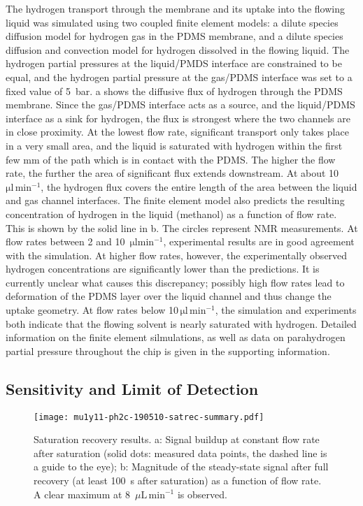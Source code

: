 The hydrogen transport through the membrane and its uptake into the flowing
liquid was simulated using two coupled finite element models: a dilute species
diffusion model for hydrogen gas in the PDMS membrane, and a dilute species
diffusion and convection model for hydrogen dissolved in the flowing liquid. The
hydrogen partial pressures at the liquid/PMDS interface are constrained to be
equal, and the hydrogen partial pressure at the gas/PDMS interface was set to a
fixed value of 5~bar. a shows the diffusive flux of hydrogen
through the PDMS membrane.  Since the gas/PDMS interface acts as a source, and
the liquid/PDMS interface as a sink for hydrogen, the flux is strongest where
the two channels are in close proximity. At the lowest flow rate, significant
transport only takes place in a very small area, and the liquid is saturated
with hydrogen within the first few mm of the path which is in contact with the
PDMS. The higher the flow rate, the further the area of significant flux extends
downstream. At about 10~$\mathrm{\mu l \,min^{-1}}$, the hydrogen flux covers
the entire length of the area between the liquid and gas channel interfaces. The
finite element model also predicts the resulting concentration of hydrogen in
the liquid (methanol) as a function of flow rate. This is shown by the solid
line in  b. The circles represent NMR measurements. At
flow rates between 2 and 10~$\mathrm{\mu l min^{-1}}$, experimental results are
in good agreement with the simulation. At higher flow rates, however, the
experimentally observed hydrogen concentrations are significantly lower than the
predictions. It is currently unclear what causes this discrepancy; possibly high
flow rates lead to deformation of the PDMS layer over the liquid channel and
thus change the uptake geometry. At flow rates below 10$\,\mathrm{\mu l
\,min^{-1}}$, the simulation and experiments both indicate that the flowing
solvent is nearly saturated with hydrogen. Detailed information on the finite
element silmulations, as well as data on parahydrogen partial pressure
throughout the chip is given in the supporting information.

\subsection{Sensitivity and Limit of Detection}

\begin{figure}
	\centering
	\texttt{[image: mu1y11-ph2c-190510-satrec-summary.pdf]}
	\caption{Saturation recovery results.
  a: Signal buildup at constant
	flow rate after saturation (solid dots: measured data points,
  the dashed line is a guide to the eye);
	b: Magnitude of the steady-state signal after full recovery (at least
	100~s after saturation) as a function of flow rate. A clear maximum
	at 8~$\mu\mathrm{L}\,\text{min}^{-1}$ is observed.}
	\label{fig:satrec-summary}
\end{figure}


